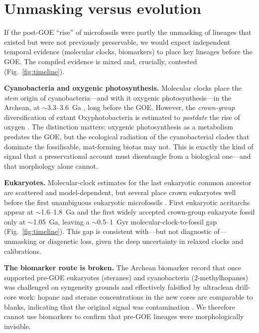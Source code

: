 \documentclass[11pt]{article}
\begin{document}
\section{Unmasking versus evolution}\label{sec:unmask}

If the post-GOE ``rise'' of microfossils were partly the unmasking of lineages that existed but
were not previously preservable, we would expect independent temporal evidence (molecular clocks,
biomarkers) to place key lineages before the GOE. The compiled evidence is mixed and, crucially,
contested (Fig.~\ref{fig:timeline}).

\textbf{Cyanobacteria and oxygenic photosynthesis.} Molecular clocks place the \emph{stem} origin of
cyanobacteria---and with it oxygenic photosynthesis---in the Archean, at $\sim$3.3--3.6~Ga
\citep{Sanchez2021}, long before the GOE. However, the \emph{crown-group}
diversification of extant Oxyphotobacteria is estimated to \emph{postdate} the rise of oxygen
\citep{Shih2017}. The distinction matters: oxygenic photosynthesis as a metabolism predates the GOE,
but the ecological radiation of the cyanobacterial clades that dominate the fossilisable, mat-forming
biotas may not. This is exactly the kind of signal that a preservational account must disentangle
from a biological one---and that morphology alone cannot.

\textbf{Eukaryotes.} Molecular-clock estimates for the last eukaryotic common ancestor are scattered
and model-dependent, but several place crown eukaryotes well before the first unambiguous eukaryotic
microfossils \citep{Betts2018,Eme2014}. First eukaryotic acritarchs appear at $\sim$1.6--1.8~Ga and
the first widely accepted crown-group eukaryote fossil only at $\sim$1.05~Ga, leaving a
$\sim$0.5--1~Gyr molecular-clock-to-fossil gap (Fig.~\ref{fig:timeline}). This gap is consistent
with---but not diagnostic of---unmasking or diagenetic loss, given the deep uncertainty in relaxed
clocks and calibrations.

\textbf{The biomarker route is broken.} The Archean biomarker record that once supported pre-GOE
eukaryotes (steranes) and cyanobacteria (2-methylhopanes) \citep{Brocks1999,Brocks2003} was
challenged on syngeneity grounds \citep{Rasmussen2008} and effectively falsified by ultraclean
drill-core work: hopane and sterane concentrations in the new cores are comparable to blanks,
indicating that the original signal was contamination \citep{French2015}. We therefore cannot use
biomarkers to confirm that pre-GOE lineages were morphologically invisible.
\end{document}

